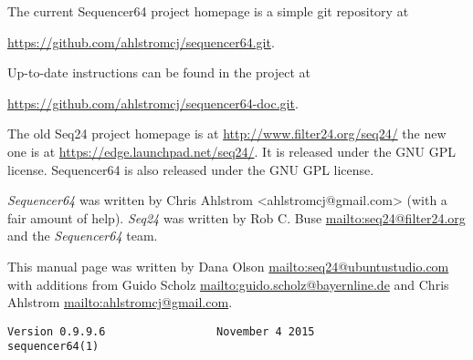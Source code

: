    The current Sequencer64 project homepage is a simple git repository at

   \url{https://github.com/ahlstromcj/sequencer64.git}.

   Up-to-date instructions can be found in the project at

   \url{https://github.com/ahlstromcj/sequencer64-doc.git}.

   The old Seq24 project homepage is at
   \url{http://www.filter24.org/seq24/} the new
   one is at \url{https://edge.launchpad.net/seq24/}.
   It is released under the GNU GPL license.
   Sequencer64 is also released under the GNU GPL license.

   \textsl{Sequencer64} was written by Chris Ahlstrom <ahlstromcj@gmail.com>
   (with a fair amount of help).
   \textsl{Seq24} was written by Rob C. Buse \url{mailto:seq24@filter24.org}
   and the \textsl{Sequencer64} team.

   This manual page was written by Dana Olson
   \url{mailto:seq24@ubuntustudio.com} with additions from Guido Scholz
   \url{mailto:guido.scholz@bayernline.de} and Chris Ahlstrom
   \url{mailto:ahlstromcj@gmail.com}.

   \begin{verbatim}
Version 0.9.9.6                 November 4 2015                  sequencer64(1)
   \end{verbatim}

